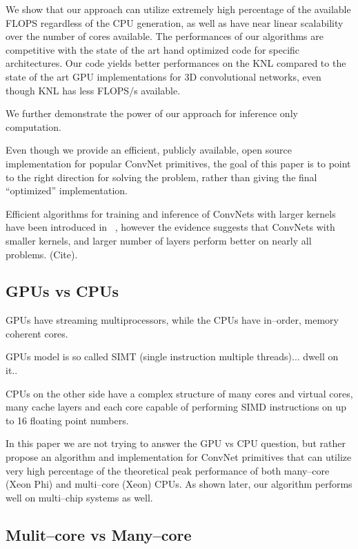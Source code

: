   We show that our approach can utilize extremely high percentage of
  the available FLOPS regardless of the CPU generation, as well as
  have near linear scalability over the number of cores available.
  The performances of our algorithms are competitive with the state of
  the art hand optimized code for specific architectures.  Our code
  yields better performances on the KNL compared to the state of the
  art GPU implementations for 3D convolutional networks, even though
  KNL has less FLOPS/s available.

  We further demonstrate the power of our approach for inference only
  computation.

  Even though we provide an efficient, publicly available, open source
  implementation for popular ConvNet primitives, the goal of this
  paper is to point to the right direction for solving the problem,
  rather than giving the final ``optimized'' implementation.

  Efficient algorithms for training and inference of ConvNets with
  larger kernels have been introduced in
  ~\cite{zlateski2016znn,zlateski2016znni}, however the evidence
  suggests that ConvNets with smaller kernels, and larger number of
  layers perform better on nearly all problems. (Cite).

  \subsection{GPUs vs CPUs}

  GPUs have streaming multiprocessors, while the CPUs have in--order,
  memory coherent cores.

  GPUs model is so called SIMT (single instruction multiple
  threads)... dwell on it..

  CPUs on the other side have a complex structure of many cores and
  virtual cores, many cache layers and each core capable of performing
  SIMD instructions on up to 16 floating point numbers.

  In this paper we are not trying to answer the GPU vs CPU question,
  but rather propose an algorithm and implementation for ConvNet
  primitives that can utilize very high percentage of the theoretical
  peak performance of both many--core (Xeon Phi) and multi--core
  (Xeon) CPUs.  As shown later, our algorithm performs well on
  multi--chip systems as well.

  \subsection{Mulit--core vs Many--core}

